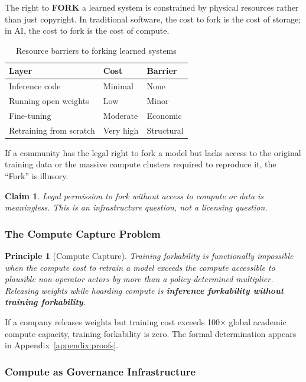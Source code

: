\documentclass{article}
\newtheorem{claim}{Claim}
\newtheorem{principle}{Principle}
\begin{document}
The right to \textbf{FORK} a learned system is constrained by physical resources rather than just copyright. In traditional software, the cost to fork is the cost of storage; in AI, the cost to fork is the cost of compute.

\begin{table}[htbp]
\centering
\begin{tabular}{@{}lll@{}}
\toprule
\textbf{Layer} & \textbf{Cost} & \textbf{Barrier} \\
\midrule
Inference code & Minimal & None \\
Running open weights & Low & Minor \\
Fine-tuning & Moderate & Economic \\
Retraining from scratch & Very high & Structural \\
\bottomrule
\end{tabular}
\caption{Resource barriers to forking learned systems}
\end{table}

If a community has the legal right to fork a model but lacks access to the original training data or the massive compute clusters required to reproduce it, the ``Fork'' is illusory.

\begin{claim}
Legal permission to fork without access to compute or data is meaningless. This is an infrastructure question, not a licensing question.
\end{claim}

\subsubsection{The Compute Capture Problem}
\label{subsubsec:compute-capture}

\begin{principle}[Compute Capture]
Training forkability is functionally impossible when the compute cost to retrain a model exceeds the compute accessible to plausible non-operator actors by more than a policy-determined multiplier. Releasing weights while hoarding compute is \textbf{inference forkability without training forkability}.
\end{principle}

If a company releases weights but training cost exceeds 100$\times$ global academic compute capacity, training forkability is zero. The formal determination appears in Appendix~\ref{appendix:proofs}.

\subsubsection{Compute as Governance Infrastructure}
\end{document}
